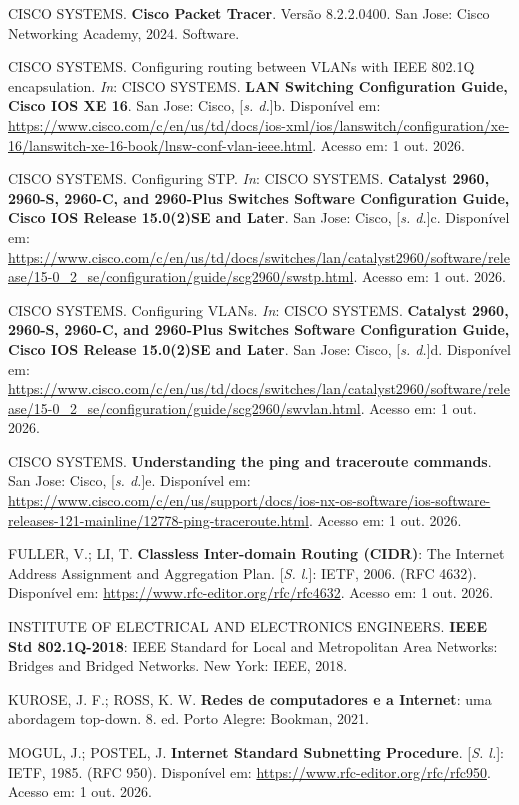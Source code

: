 CISCO SYSTEMS. \textbf{Cisco Packet Tracer}. Versão 8.2.2.0400. San Jose: Cisco Networking Academy, 2024. Software.

CISCO SYSTEMS. Configuring routing between VLANs with IEEE 802.1Q encapsulation. \emph{In}: CISCO SYSTEMS. \textbf{LAN Switching Configuration Guide, Cisco IOS XE 16}. San Jose: Cisco, [\emph{s. d.}]b. Disponível em: \url{https://www.cisco.com/c/en/us/td/docs/ios-xml/ios/lanswitch/configuration/xe-16/lanswitch-xe-16-book/lnsw-conf-vlan-ieee.html}. Acesso em: 1 out. 2026.

CISCO SYSTEMS. Configuring STP. \emph{In}: CISCO SYSTEMS. \textbf{Catalyst 2960, 2960-S, 2960-C, and 2960{-}Plus Switches Software Configuration Guide, Cisco IOS Release 15.0(2)SE and Later}. San Jose: Cisco, [\emph{s. d.}]c. Disponível em: \url{https://www.cisco.com/c/en/us/td/docs/switches/lan/catalyst2960/software/release/15-0_2_se/configuration/guide/scg2960/swstp.html}. Acesso em: 1 out. 2026.

CISCO SYSTEMS. Configuring VLANs. \emph{In}: CISCO SYSTEMS. \textbf{Catalyst 2960, 2960-S, 2960-C, and 2960{-}Plus Switches Software Configuration Guide, Cisco IOS Release 15.0(2)SE and Later}. San Jose: Cisco, [\emph{s. d.}]d. Disponível em: \url{https://www.cisco.com/c/en/us/td/docs/switches/lan/catalyst2960/software/release/15-0_2_se/configuration/guide/scg2960/swvlan.html}. Acesso em: 1 out. 2026.

CISCO SYSTEMS. \textbf{Understanding the ping and traceroute commands}. San Jose: Cisco, [\emph{s. d.}]e. Disponível em: \url{https://www.cisco.com/c/en/us/support/docs/ios-nx-os-software/ios-software-releases-121-mainline/12778-ping-traceroute.html}. Acesso em: 1 out. 2026.

FULLER, V.; LI, T. \textbf{Classless Inter-domain Routing (CIDR)}: The Internet Address Assignment and Aggregation Plan. [\emph{S. l.}]: IETF, 2006. (RFC 4632). Disponível em: \url{https://www.rfc-editor.org/rfc/rfc4632}. Acesso em: 1 out. 2026.

INSTITUTE OF ELECTRICAL AND ELECTRONICS ENGINEERS. \textbf{IEEE Std 802.1Q-2018}: IEEE Standard for Local and Metropolitan Area Networks: Bridges and Bridged Networks. New York: IEEE, 2018.

KUROSE, J. F.; ROSS, K. W. \textbf{Redes de computadores e a Internet}: uma abordagem top-down. 8. ed. Porto Alegre: Bookman, 2021.

MOGUL, J.; POSTEL, J. \textbf{Internet Standard Subnetting Procedure}. [\emph{S. l.}]: IETF, 1985. (RFC 950). Disponível em: \url{https://www.rfc-editor.org/rfc/rfc950}. Acesso em: 1 out. 2026.


